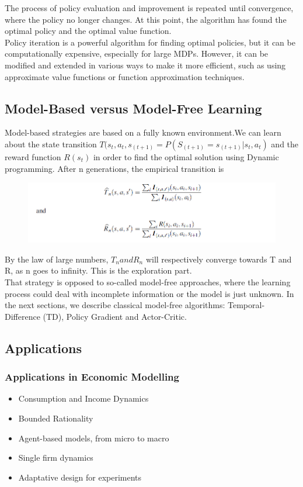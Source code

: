 \documentclass{article}
\begin{document}
The process of policy evaluation and improvement is repeated until convergence, where the policy no longer changes. At this point, the algorithm has found the optimal policy and the optimal value function.\\

Policy iteration is a powerful algorithm for finding optimal policies, but it can be computationally expensive, especially for large MDPs. However, it can be modified and extended in various ways to make it more efficient, such as using approximate value functions or function approximation techniques.

\subsection{Model-Based versus Model-Free Learning}
Model-based strategies are based on a fully known environment.We can learn about the state transition $T(s_t, a_t, s_(t+1) = P(S_(t+1) = s_(t+1)|s_t, a_t)$ and the reward function $R(s_t)$ in order to find the optimal solution using Dynamic programming. After n generations, the empirical transition is

\begin{figure}[H]
\begin{center}
\includegraphics[scale = 0.5]{ex.png}
\end{center}
\end{figure}

By the law of large numbers, $T_n and R_n$ will respectively converge towards T and R, as n goes to infinity. This is the exploration part.\\
That strategy is opposed to so-called model-free approaches, where the learning process could deal with incomplete information or the model is just unknown. In the next sections, we describe classical model-free algorithms: Temporal-Difference (TD), Policy Gradient and Actor-Critic.

\subsection{Applications}
\subsubsection{Applications in Economic Modelling}
\begin{itemize}
\item Consumption and Income Dynamics
\item Bounded Rationality
\item Agent-based models, from micro to macro
\item Single firm dynamics
\item Adaptative design for experiments
\end{itemize}
\end{document}
